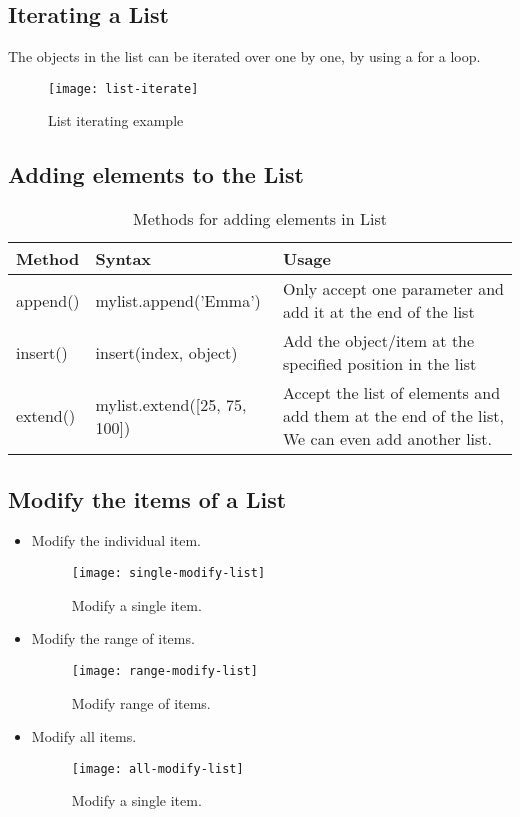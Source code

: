 \subsection{Iterating a List}
The objects in the list can be iterated over one by one, by using a for a loop.
\newpage
\begin{figure}[h]
	\centering
	\texttt{[image: list-iterate]}
	\caption{List iterating example}
	\label{fig:list-iterate}
\end{figure}

\subsection{Adding elements to the List}
\begin{table}[h!]
	\centering
	\begin{tabularx}{\textwidth}{|l|l|X|}
		\hline
		\textbf{Method} & \textbf{Syntax} & \textbf{Usage} \\
		\hline
		append() & mylist.append('Emma') & Only accept one parameter and add it at the end of the list \\
		\hline
		insert() & insert(index, object) & Add the object/item at the specified position in the list \\
		\hline
		extend() & mylist.extend([25, 75, 100]) & Accept the list of elements and add them at the end of the list, We can even add another list. \\
		\hline

	\end{tabularx}
	\caption{Methods for adding elements in List}
	\label{tab:list-add-opers}
\end{table}

\subsection{Modify the items of a List}

\begin{itemize}
	\item Modify the individual item.
		\begin{figure}[h]
			\centering
			\texttt{[image: single-modify-list]}
			\caption{Modify a single item.}
			\label{fig:list-single-modify-list}
		\end{figure}
	\newpage
	\item Modify the range of items.
		\begin{figure}[h]
			\centering
			\texttt{[image: range-modify-list]}
			\caption{Modify range of items.}
			\label{fig:list-range-modify-list}
		\end{figure}
	\item Modify all items.
		\begin{figure}[h]
			\centering
			\texttt{[image: all-modify-list]}
			\caption{Modify a single item.}
			\label{fig:list-all-modify-list}
		\end{figure}
\end{itemize}

